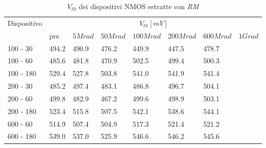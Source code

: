 \documentclass[12pt, letterpaper]{book}
\begin{document}
\begin{table}[H]
  \renewcommand{\arraystretch}{1.3}
    \begin{tabular}{m{2cm} m{0.8cm} m{1.1cm} m{1.3cm} m{1.5cm} m{1.5cm} m{1.5cm} m{1cm}}
      \toprule
      \multirow{2}{*}{Dispositivo} & \multicolumn{7}{c}{$V_{th} [mV] $}                                                                    \\
      \cmidrule{2-8}
                                   	& pre  			& $5Mrad$ & $50Mrad$ & $100Mrad$ & $200Mrad$ & $600Mrad$ & $1Grad$ \\
      \midrule
      100 - 30                 	& 494.2      		& 490.9		& 476.2    	& 449.9 		& 447.5     	& 478.7     	&    \\
      \hline
      100 - 60                  	& 485.6            	& 481.8   	& 470.9   	& 502.5  	& 499.4     	& 500.3     	&    \\
	\hline
      100 - 180               	& 529.4          	& 527.8		& 503.8    	& 541.0    	& 541.9    	& 541.4    	&    \\
      \hline
      200 - 30 			& 485.2          	& 497.4   	&483.1   	& 486.8  	& 496.7    	& 504.1 		&    \\
      \hline
      200 - 60                  	& 499.8			& 482.9  	&467.2     	& 499.6    	& 498.9   	& 503.1    	&    \\
      \hline
      200 - 180                 	& 523.4    		& 515.8    	& 507.5  	& 542.1   	& 538.6    	& 544.1    	&    \\
      \hline
      600 - 60              	& 514.9          	& 507.4    	&504.9    	& 517.3     	& 521.4     	& 521.2     	&    \\
      \hline
      600 - 180                	& 539.0              	& 537.0    	&525.9    	& 546.6     	& 546.2    	& 545.6      	&    \\
      \bottomrule
    \end{tabular}
  \caption{$V_{th}$ dei dispositivi NMOS estratte con \emph{RM}}
  \label{tab:VthRMN}
\end{table}
\end{document}
